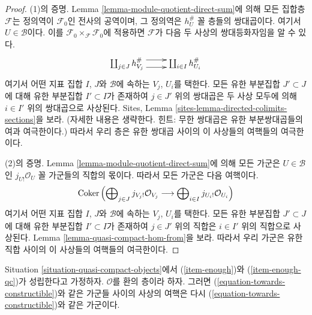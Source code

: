 \begin{proof}
(1)의 증명. Lemma \ref{lemma-module-quotient-direct-sum}에 의해 모든 집합층
$\mathcal{F}$는 정의역이 $\mathcal{F}_0$인 전사의 공역이며, 그 정의역은
$h_{U}^\#$ 꼴 층들의 쌍대곱이다. 여기서 $U \in \mathcal{B}$이다.
이를 $\mathcal{F}_0 \times_\mathcal{F} \mathcal{F}_0$에 적용하면
$\mathcal{F}$가 다음 두 사상의 쌍대등화자임을 알 수 있다.
$$
\xymatrix{
\coprod\nolimits_{j \in J} h_{V_j}^\#
\ar@<1ex>[r] \ar@<-1ex>[r] &
\coprod\nolimits_{i \in I} h_{U_i}^\#
}
$$
여기서 어떤 지표 집합 $I$, $J$와 $\mathcal{B}$에 속하는 $V_j$, $U_i$를
택한다. 모든 유한 부분집합 $J' \subset J$에 대해 유한 부분집합
$I' \subset I$가 존재하여 $j \in J'$ 위의 쌍대곱은 두 사상 모두에 의해
$i \in I'$ 위의 쌍대곱으로 사상된다. Sites, Lemma
\ref{sites-lemma-directed-colimits-sections}을 보라. (자세한 내용은 생략한다.
힌트: 무한 쌍대곱은 유한 부분쌍대곱들의 여과 여극한이다.) 따라서 우리 층은
유한 쌍대곱 사이의 이 사상들의 여핵들의 여극한이다.

\medskip\noindent
(2)의 증명. Lemma \ref{lemma-module-quotient-direct-sum}에 의해 모든 가군은
$U \in \mathcal{B}$인 $j_{U!}\mathcal{O}_U$ 꼴 가군들의 직합의 몫이다.
따라서 모든 가군은 다음 여핵이다.
$$
\mathop{\mathrm{Coker}}\left(
\bigoplus\nolimits_{j \in J} j_{V_j!}\mathcal{O}_{V_j}
\longrightarrow
\bigoplus\nolimits_{i \in I} j_{U_i!}\mathcal{O}_{U_i}
\right)
$$
여기서 어떤 지표 집합 $I$, $J$와 $\mathcal{B}$에 속하는 $V_j$, $U_i$를
택한다. 모든 유한 부분집합 $J' \subset J$에 대해 유한 부분집합
$I' \subset I$가 존재하여 $j \in J'$ 위의 직합은 $i \in I'$ 위의 직합으로
사상된다. Lemma \ref{lemma-quasi-compact-hom-from}을 보라. 따라서 우리 가군은
유한 직합 사이의 이 사상들의 여핵들의 여극한이다.
\end{proof}

\begin{lemma}
\label{lemma-cokernel-map-towards-constructibles}
Situation \ref{situation-quasi-compact-objects}에서
(\ref{item-enough})와 (\ref{item-enough-qc})가 성립한다고 가정하자.
$\mathcal{O}$를 환의 층이라 하자. 그러면
(\ref{equation-towards-constructible})와 같은 가군들 사이의 사상의 여핵은
다시 (\ref{equation-towards-constructible})와 같은 가군이다.
\end{lemma}

